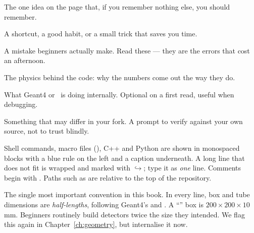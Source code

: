 \begin{keypoint}The one idea on the page that, if you remember nothing else, you should remember.\end{keypoint}
\begin{tip}A shortcut, a good habit, or a small trick that saves you time.\end{tip}
\begin{pitfall}A mistake beginners actually make. Read these --- they are the errors that cost an afternoon.\end{pitfall}
\begin{physics}The physics behind the code: why the numbers come out the way they do.\end{physics}
\begin{hood}What Geant4 or \musrSim\ is doing internally. Optional on a first read, useful when debugging.\end{hood}
\begin{checkbuild}Something that may differ in your fork. A prompt to verify against your own source, not to trust blindly.\end{checkbuild}

Shell commands, macro files (), C++ and Python are shown in monospaced blocks with a blue rule on the left and a caption underneath. A long line that does not fit is wrapped and marked with \(\hookrightarrow\); type it as \emph{one} line. Comments begin with \code{#}. Paths such as  are relative to the top of the repository.

\begin{pitfall}
The single most important convention in this book. In every  line, box and tube dimensions are \emph{half-lengths}, following Geant4's  and . A ``'' box is \(200\times200\times10\)\,mm. Beginners routinely build detectors twice the size they intended. We flag this again in Chapter~\ref{ch:geometry}, but internalise it now.
\end{pitfall}

{\hypersetup{linkcolor=ink}\tableofcontents}
